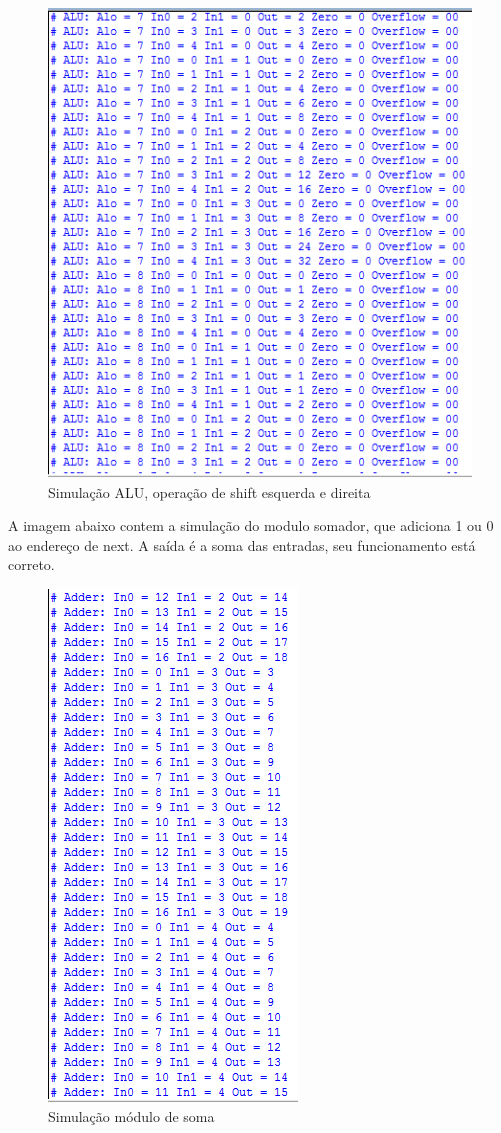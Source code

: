 \documentclass[a4paper, 10pt]{article}
\begin{document}
\begin{figure}[H]
	\centering
	\includegraphics[scale=0.7]{sumuALU(sl-sr).PNG}
	\caption{Simulação ALU, operação de shift esquerda e direita}
	\label{Rotulo}
\end{figure}
A imagem abaixo contem a simulação do modulo somador, que adiciona 1 ou 0 ao endereço de next. A saída é a soma das entradas, seu funcionamento está correto.

\begin{figure}[H]
	\centering
	\includegraphics[scale=0.7]{simuAdder.PNG}
	\caption{Simulação módulo de soma}
	\label{Rotulo}
\end{figure}
\newpage
\end{document}

